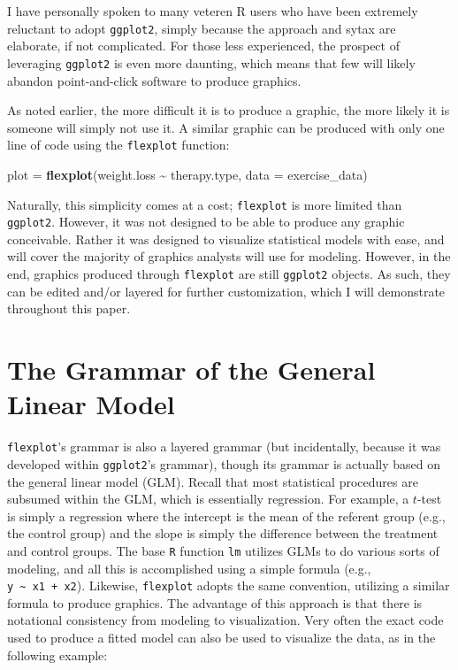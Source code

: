 \documentclass[
  english,
  man]{apa6}
\newenvironment{Shaded}{\begin{snugshade}}{\end{snugshade}}
\newcommand{\DataTypeTok}[1]{\textcolor[rgb]{0.13,0.29,0.53}{#1}}
\newcommand{\KeywordTok}[1]{\textcolor[rgb]{0.13,0.29,0.53}{\textbf{#1}}}
\newcommand{\NormalTok}[1]{#1}
\newcommand{\OperatorTok}[1]{\textcolor[rgb]{0.81,0.36,0.00}{\textbf{#1}}}
\newcommand{\StringTok}[1]{\textcolor[rgb]{0.31,0.60,0.02}{#1}}
\begin{document}
\normalsize

I have personally spoken to many veteren R users who have been extremely reluctant to adopt \texttt{ggplot2}, simply because the approach and sytax are elaborate, if not complicated. For those less experienced, the prospect of leveraging \texttt{ggplot2} is even more daunting, which means that few will likely abandon point-and-click software to produce graphics.

As noted earlier, the more difficult it is to produce a graphic, the more likely it is someone will simply not use it. A similar graphic can be produced with only one line of code using the \texttt{flexplot} function:

\small

\begin{Shaded}
\begin{Highlighting}[]
\NormalTok{plot =}\StringTok{ }\KeywordTok{flexplot}\NormalTok{(weight.loss }\OperatorTok{\textasciitilde{}}\StringTok{ }\NormalTok{therapy.type, }\DataTypeTok{data =}\NormalTok{ exercise\_data)}
\end{Highlighting}
\end{Shaded}

\normalsize

Naturally, this simplicity comes at a cost; \texttt{flexplot} is more limited than \texttt{ggplot2}. However, it was not designed to be able to produce any graphic conceivable. Rather it was designed to visualize statistical models with ease, and will cover the majority of graphics analysts will use for modeling. However, in the end, graphics produced through \texttt{flexplot} are still \texttt{ggplot2} objects. As such, they can be edited and/or layered for further customization, which I will demonstrate throughout this paper.

\hypertarget{the-grammar-of-the-general-linear-model}{%
\section{The Grammar of the General Linear Model}\label{the-grammar-of-the-general-linear-model}}

\texttt{flexplot}'s grammar is also a layered grammar (but incidentally, because it was developed within \texttt{ggplot2}'s grammar), though its grammar is actually based on the general linear model (GLM). Recall that most statistical procedures are subsumed within the GLM, which is essentially regression. For example, a \(t\)-test is simply a regression where the intercept is the mean of the referent group (e.g., the control group) and the slope is simply the difference between the treatment and control groups. The base \texttt{R} function \texttt{lm} utilizes GLMs to do various sorts of modeling, and all this is accomplished using a simple formula (e.g., \texttt{y\ \textasciitilde{}\ x1\ +\ x2}). Likewise, \texttt{flexplot} adopts the same convention, utilizing a similar formula to produce graphics. The advantage of this approach is that there is notational consistency from modeling to visualization. Very often the exact code used to produce a fitted model can also be used to visualize the data, as in the following example:
\end{document}
